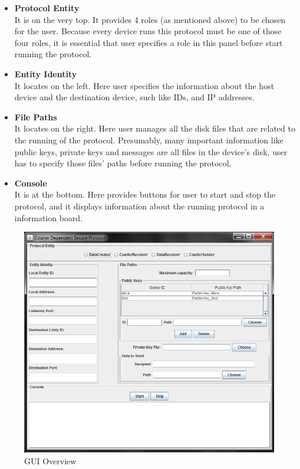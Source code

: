 \begin{itemize}
\item \textbf{Protocol Entity}\\
It is on the very top. It provides 4 roles (as mentioned above) to be chosen for the user. Because every device runs this protocol must be one of those four roles, it is essential that user specifies a role in this panel before start running the protocol.
\item \textbf{Entity Identity}\\
It locates on the left. Here user specifies the information about the host device and the destination device, such like IDs, and IP addresses.
\item \textbf{File Paths}\\
It locates on the right. Here user manages all the disk files that are related to the running of the protocol. Presumably, many important information like public keys, private keys and messages are all files in the device's disk, user has to specify those files' paths before running the protocol.
\item \textbf{Console}\\
It is at the bottom. Here provides buttons for user to start and stop the protocol, and it displays information about the running protocol in a information board.
\end{itemize}

\begin{figure}[h!]
\centering
\includegraphics[width=\textwidth,natwidth=818,natheight=722]{figures/guiall.png}
\caption{GUI Overview}
\end{figure}

